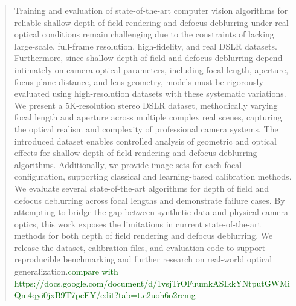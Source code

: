 \documentclass[runningheads]{llncs}
\begin{document}
\begin{abstract}
    Training and evaluation of state-of-the-art computer vision algorithms for reliable shallow depth of field rendering and defocus deblurring under real optical conditions remain challenging due to the constraints of lacking large-scale, full-frame resolution, high-fidelity, and real DSLR datasets. Furthermore, since shallow depth of field and defocus deblurring depend intimately on camera optical parameters, including focal length, aperture, focus plane distance, and lens geometry, models must be rigorously evaluated using high-resolution datasets with these systematic variations. We present a 5K-resolution stereo DSLR dataset, methodically varying focal length and aperture across multiple complex real scenes, capturing the optical realism and complexity of professional camera systems. The introduced dataset enables controlled analysis of geometric and optical effects for shallow depth-of-field rendering and defocus deblurring algorithms. Additionally, we provide image sets for each focal configuration, supporting classical and learning-based calibration methods. We evaluate several state-of-the-art algorithms for depth of field and defocus deblurring across focal lengths and demonstrate failure cases. By attempting to bridge the gap between synthetic data and physical camera optics, this work exposes the limitations in current state-of-the-art methods for both depth of field rendering and defocus deblurring. We release the dataset, calibration files, and evaluation code to support reproducible benchmarking and further research on real-world optical generalization.\textcolor{darkgreen}{compare with https://docs.google.com/document/d/1vsjTrOFuumkASIkkYNtputGWMiQm4qyi0jxB9T7peEY/edit?tab=t.c2uoh6o2remg}
    

\end{abstract}
\end{document}
